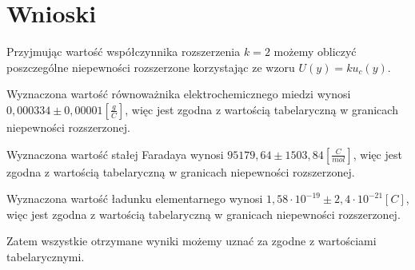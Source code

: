 \documentclass[a4paper,10pt,twoside]{article}
\begin{document}
\section{Wnioski}
Przyjmując wartość współczynnika rozszerzenia $k = 2$ możemy obliczyć poszczególne niepewności rozszerzone korzystając ze wzoru $U(y) = k u_c(y)$.

Wyznaczona wartość równoważnika elektrochemicznego miedzi wynosi $0,000334 \pm 0,00001 [\frac{g}{C}]$, więc jest zgodna z wartością tabelaryczną w granicach niepewności rozszerzonej.

Wyznaczona wartość stałej Faradaya wynosi $95179,64 \pm 1503,84 [\frac{C}{mol}]$, więc jest zgodna z wartością tabelaryczną w granicach niepewności rozszerzonej.

Wyznaczona wartość ładunku elementarnego wynosi $1,58\cdot10^{-19} \pm 2,4\cdot10^{-21}[C]$, więc jest zgodna z wartością tabelaryczną w granicach niepewności rozszerzonej.

Zatem wszystkie otrzymane wyniki możemy uznać za zgodne z wartościami tabelarycznymi.
\end{document}
